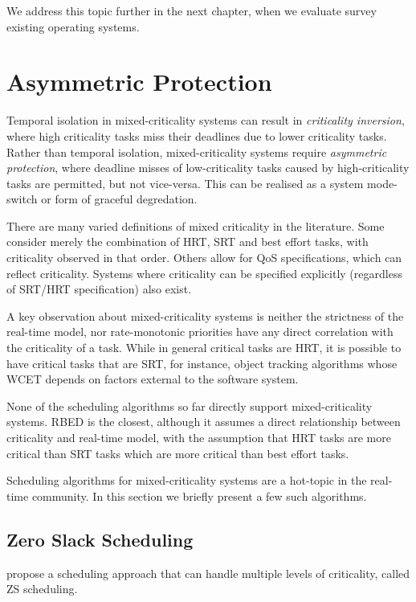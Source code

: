 We address this topic further in the next chapter, when we evaluate survey existing operating systems.

\section{Asymmetric Protection} 

Temporal isolation in mixed-criticality systems can result in \emph{criticality inversion}, where high criticality tasks miss their deadlines due to lower criticality tasks.
Rather than temporal isolation, mixed-criticality systems require \emph{asymmetric protection}, where deadline misses of low-criticality tasks caused by high-criticality tasks are permitted, but not vice-versa.
This can be realised as a system mode-switch or form of graceful degredation.

There are many varied definitions of mixed criticality in the literature.
Some consider merely the combination of \gls{HRT}, \gls{SRT} and best effort tasks, with criticality observed in that order.
Others allow for \gls{QoS} specifications, which can reflect criticality.
Systems where criticality can be specified explicitly (regardless of SRT/HRT specification) also exist.

A key observation about mixed-criticality systems is neither the strictness of the real-time model, nor rate-monotonic priorities have any direct correlation with the criticality of a task.
While in general critical tasks are \gls{HRT}, it is possible to have critical tasks that are \gls{SRT}, for instance, object tracking algorithms whose \gls{WCET} depends on factors external to the software system.

None of the scheduling algorithms so far directly support mixed-criticality systems.
\gls{RBED} is the closest, although it assumes a direct relationship between criticality and real-time model, with the assumption that \gls{HRT} tasks are more critical than \gls{SRT} tasks which are more critical than best effort tasks.

Scheduling algorithms for mixed-criticality systems are a hot-topic in the real-time community.
In this section we briefly present a few such algorithms.


\subsection{Zero Slack Scheduling}

 propose a scheduling approach that can handle multiple levels of criticality, called \gls{ZS} scheduling.

